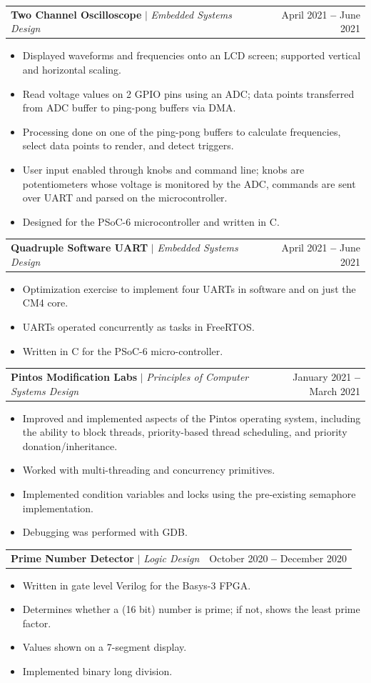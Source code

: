 \documentclass[letterpaper,11pt]{article}
\makeatletter
\newcommand{\resumeItem}[1]{
  \item\small{
    {#1 \vspace{-2pt}}
  }
}
\newcommand{\resumeProjectHeading}[2]{
    \vspace{-2pt}\item
    \begin{tabular*}{0.97\textwidth}{l@{\extracolsep{\fill}}r}
      \small#1 & #2 \\
    \end{tabular*}\vspace{-7pt}
}
\newcommand{\resumeItemListStart}{\begin{itemize}}
\newcommand{\resumeItemListEnd}{\end{itemize}\vspace{-5pt}}
\makeatother
\begin{document}
      \resumeProjectHeading
        {\textbf{Two Channel Oscilloscope} $|$ \emph{Embedded Systems Design}}{April 2021 \textbf{--} June 2021}
          \resumeItemListStart
            \resumeItem{Displayed waveforms and frequencies onto an LCD screen; supported vertical and horizontal scaling.}
            \resumeItem{Read voltage values on 2 GPIO pins using an ADC; data points transferred from ADC buffer to ping-pong buffers via DMA.}
            \resumeItem{Processing done on one of the ping-pong buffers to calculate frequencies, select data points to render, and detect triggers.}
            \resumeItem{User input enabled through knobs and command line; knobs are potentiometers whose voltage is monitored by the ADC, commands are sent over UART and parsed on the microcontroller.}
            \resumeItem{Designed for the PSoC-6 microcontroller and written in C.}
          \resumeItemListEnd

      \resumeProjectHeading
        {\textbf{Quadruple Software UART} $|$ \emph{Embedded Systems Design}}{April 2021 \textbf{--} June 2021}
          \resumeItemListStart
            \resumeItem{Optimization exercise to implement four UARTs in software and on just the CM4 core.}
            \resumeItem{UARTs operated concurrently as tasks in FreeRTOS.}
            \resumeItem{Written in C for the PSoC-6 micro-controller.}
          \resumeItemListEnd

      \resumeProjectHeading
        {\textbf{Pintos Modification Labs} $|$ \emph{Principles of Computer Systems Design}}{January 2021 \textbf{--} March 2021}
          \resumeItemListStart
            \resumeItem{Improved and implemented aspects of the Pintos operating system, including the ability to block threads, priority-based thread scheduling, and priority donation/inheritance.}
            \resumeItem{Worked with multi-threading and concurrency primitives.}
            \resumeItem{Implemented condition variables and locks using the pre-existing semaphore implementation.}
            \resumeItem{Debugging was performed with GDB.}
          \resumeItemListEnd

      \resumeProjectHeading
        {\textbf{Prime Number Detector} $|$ \emph{Logic Design}}{October 2020 \textbf{--} December 2020}
          \resumeItemListStart
            \resumeItem{Written in gate level Verilog for the Basys-3 FPGA.}
            \resumeItem{Determines whether a (16 bit) number is prime; if not, shows the least prime factor.}
            \resumeItem{Values shown on a 7-segment display.}
            \resumeItem{Implemented binary long division.}
          \resumeItemListEnd
\end{document}
